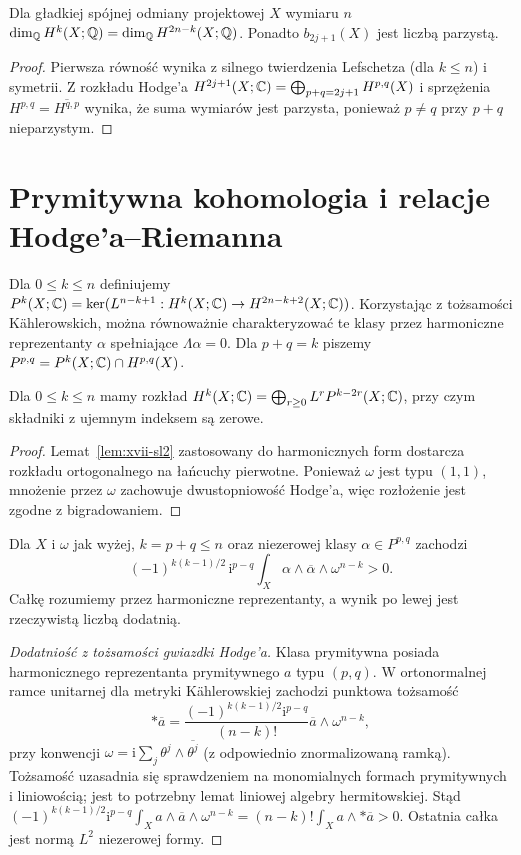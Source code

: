 \begin{wniosek}
Dla gładkiej spójnej odmiany projektowej $X$ wymiaru $n$
$\dim_{\mathbb{Q}} H^k(X;\mathbb{Q})=\dim_{\mathbb{Q}} H^{2n-k}(X;\mathbb{Q})$.
Ponadto $b_{2j+1}(X)$ jest liczbą parzystą.
\end{wniosek}
\begin{proof}
Pierwsza równość wynika z silnego twierdzenia Lefschetza
(dla $k\le n$) i symetrii.
Z rozkładu Hodge'a $H^{2j+1}(X;\mathbb{C})=
\bigoplus_{p+q=2j+1}H^{p,q}(X)$ i sprzężenia
$H^{p,q}=\overline{H^{q,p}}$ wynika, że suma wymiarów
jest parzysta, ponieważ $p\ne q$ przy $p+q$ nieparzystym.
\end{proof}

\section{Prymitywna kohomologia i relacje Hodge'a--Riemanna}
\begin{definicja}
Dla $0\le k\le n$ definiujemy
$P^k(X;\mathbb{C})=\ker(L^{n-k+1}:H^k(X;\mathbb{C})\to H^{2n-k+2}(X;\mathbb{C}))$.
Korzystając z tożsamości Kählerowskich, można równoważnie
charakteryzować te klasy przez harmoniczne reprezentanty
$\alpha$ spełniające $\Lambda\alpha=0$.
Dla $p+q=k$ piszemy $P^{p,q}=P^k(X;\mathbb{C})\cap H^{p,q}(X)$.
\end{definicja}
\begin{twierdzenie}
\label{thm:xvii-decomposition}
Dla $0\le k\le n$ mamy rozkład
$H^k(X;\mathbb{C})=\bigoplus_{r\ge0}L^rP^{k-2r}(X;\mathbb{C})$,
przy czym składniki z ujemnym indeksem są zerowe.
\end{twierdzenie}
\begin{proof}
Lemat~\ref{lem:xvii-sl2} zastosowany do harmonicznych form
dostarcza rozkładu ortogonalnego na łańcuchy pierwotne.
Ponieważ $\omega$ jest typu $(1,1)$, mnożenie przez
$\omega$ zachowuje dwustopniowość Hodge'a, więc
rozłożenie jest zgodne z bigradowaniem.
\end{proof}
\begin{twierdzenie}
\label{thm:xvii-HR}
Dla $X$ i $\omega$ jak wyżej, $k=p+q\le n$ oraz
niezerowej klasy $\alpha\in P^{p,q}$ zachodzi
\[
(-1)^{k(k-1)/2}\,\mathrm i^{p-q}
\int_X\alpha\wedge\overline\alpha\wedge\omega^{n-k}>0.
\]
Całkę rozumiemy przez harmoniczne reprezentanty,
a wynik po lewej jest rzeczywistą liczbą dodatnią.
\end{twierdzenie}
\begin{proof}[Dodatniość z tożsamości gwiazdki Hodge'a]
Klasa prymitywna posiada harmonicznego reprezentanta
prymitywnego $a$ typu $(p,q)$. W ortonormalnej ramce
unitarnej dla metryki Kählerowskiej zachodzi punktowa
tożsamość
\[
*\overline a=
\frac{(-1)^{k(k-1)/2}\mathrm i^{p-q}}{(n-k)!}
\overline a\wedge\omega^{n-k},
\]
przy konwencji $\omega=\mathrm i\sum_j\theta^j\wedge
\overline{\theta^j}$ (z odpowiednio znormalizowaną ramką).
Tożsamość uzasadnia się sprawdzeniem na monomialnych
formach prymitywnych i liniowością; jest to potrzebny
lemat liniowej algebry hermitowskiej. Stąd
$(-1)^{k(k-1)/2}\mathrm i^{p-q}\int_X a\wedge
\overline a\wedge\omega^{n-k}=(n-k)!\int_X a\wedge *\overline a>0$.
Ostatnia całka jest normą $L^2$ niezerowej formy.
\end{proof}
